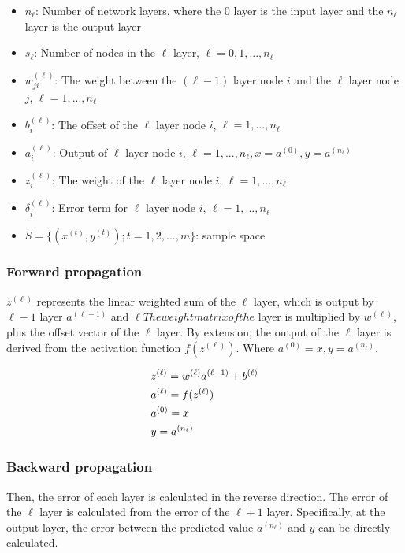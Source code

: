 \begin{content}
\begin{content}
\begin{itemize}
   \item \alert{$ {n_{\ell}} $}: Number of network layers, where the $0$ layer is the input layer and the $n_{\ell}$ layer is the output layer
   \item \alert{$ {s_{\ell}} $}: Number of nodes in the $\ell$ layer, $ \ell = 0, 1, ..., n_{\ell} $
   \item \alert{$ w_{ji}^{(\ell)} $}: The weight between the $(\ell-1)$ layer node $i$ and the $\ell$ layer node $j$, $ \ell = 1, ..., n_{\ell} $
   \item \alert{$ b_i^{(\ell)} $}: The offset of the $\ell$ layer node $i$, $ \ell = 1, ..., n_{\ell} $
   \item \alert{$ a_i^{(\ell)} $}: Output of $\ell$ layer node $i$, $ \ell = 1, ..., n_{\ell}, x = a^ {(0)}, y = a^{(n_{\ell})} $
   \item \alert{$ z_i^{(\ell)} $}: The weight of the $\ell$ layer node $i$, $ \ell = 1, ..., n_{\ell} $
   \item \alert{$ \delta _i^{(\ell)} $}: Error term for $\ell$ layer node $i$, $ \ell = 1, ..., n_{\ell} $
   \item \alert{$ S = \{ ({x^{(t)}},{y^{(t)}});t = 1,2,...,m\} $}: sample space
 \end{itemize}


\subsubsection{Forward propagation}
$z^{(\ell )}$ represents the linear weighted sum of the $\ell$ layer, which is output by $\ell - 1$ layer $a^{(\ell - 1)}$ and $\ell The weight matrix of the $ layer is multiplied by $w^{(\ell )}$, plus the offset vector of the $\ell$ layer.
By extension, the output of the $\ell$ layer is derived from the activation function $f({z^{(\ell )}})$. Where ${a^{(0)}} = x, y = {a^{({n_\ell })}}$.

\[\begin{gathered}
  {z^{(\ell )}} = {w^{(\ell )}}{a^{(\ell  - 1)}} + {b^{(\ell )}} \hfill \\
  {a^{(\ell )}} = f({z^{(\ell )}}) \hfill \\
  {a^{(0)}} = x \hfill \\
  y = {a^{({n_\ell })}} \hfill \\ 
\end{gathered} \]

\subsubsection{Backward propagation}
Then, the error of each layer is calculated in the reverse direction. The error of the $\ell$ layer is calculated from the error of the $\ell + 1$ layer. Specifically, at the output layer, the error between the predicted value $a^{({n_\ell })}$ and $y$ can be directly calculated.


\end{content}
\end{content}
